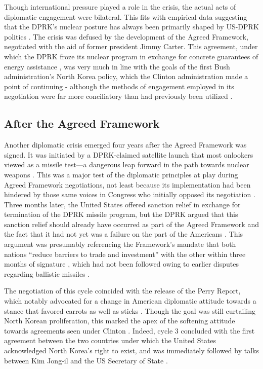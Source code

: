 Though international pressure played a role in the crisis, the actual acts of diplomatic engagement were bilateral. This fits with empirical data suggesting that the DPRK's nuclear posture has always been primarily shaped by US-DPRK politics \cite{rich14}. The crisis was defused by the development of the Agreed Framework, negotiated with the aid of former president Jimmy Carter. This agreement, under which the DPRK froze its nuclear program in exchange for concrete guarantees of energy assistance \cite{agreed}, was very much in line with the goals of the first Bush administration's North Korea policy, which the Clinton administration made a point of continuing \cite{cerami} - although the methods of engagement employed in its negotiation were far more conciliatory than had previously been utilized \cite{sigal}.

\subsection{After the Agreed Framework}

Another diplomatic crisis emerged four years after the Agreed Framework was signed. It was initiated by a DPRK-claimed satellite launch that most onlookers viewed as a missile test---a dangerous leap forward in the path towards nuclear weapons \cite{orfall}. This was a major test of the diplomatic principles at play during Agreed Framework negotiations, not least because its implementation had been hindered by those same voices in Congress who initially opposed its negotiation \cite{hecker2}. Three months later, the United States offered sanction relief in exchange for termination of the DPRK missile program, but the DPRK argued that this sanction relief should already have occurred as part of the Agreed Framework and the fact that it had not yet was a failure on the part of the Americans \cite{davenport}. This argument was presumably referencing the Framework's mandate that both nations ``reduce barriers to trade and investment'' with the other within three months of signature \cite{agreed}, which had not been followed owing to earlier disputes regarding ballistic missiles \cite{davenport}.

The negotiation of this cycle coincided with the release of the Perry Report, which notably advocated for a change in American diplomatic attitude towards a stance that favored carrots as well as sticks \cite{perry}. Though the goal was still curtailing North Korean proliferation, this marked the apex of the softening attitude towards agreements seen under Clinton \cite{bleiker}. Indeed, cycle 3 concluded with the first agreement between the two countries under which the United States acknowledged North Korea's right to exist, and was immediately followed by talks between Kim Jong-il and the US Secretary of State \cite{hecker2}.
			

